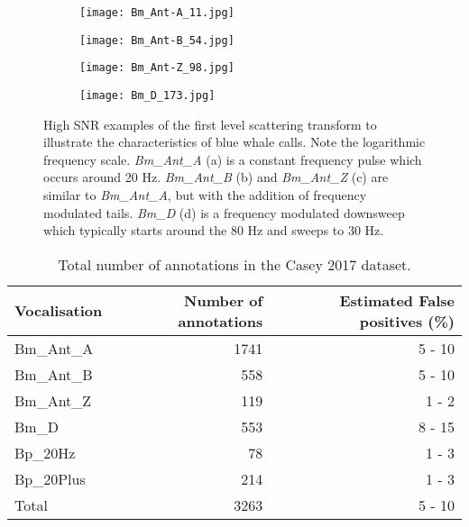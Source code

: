 {\begin{figure}
     \centering
     \begin{subfigure}[]{0.45\textwidth}
         \centering
         \texttt{[image: Bm\_Ant-A\_11.jpg]}
     \end{subfigure}
     \hfill
     \begin{subfigure}[]{0.45\textwidth}
         \centering
         \texttt{[image: Bm\_Ant-B\_54.jpg]}
     \end{subfigure}
     \hfill
     \begin{subfigure}[]{0.45\textwidth}
         \centering
         \texttt{[image: Bm\_Ant-Z\_98.jpg]}
     \end{subfigure}
     \hfill
     \begin{subfigure}[]{0.45\textwidth}
         \centering
         \texttt{[image: Bm\_D\_173.jpg]}
     \end{subfigure}
        \caption[High SNR examples of the first level scattering transform to illustrate the characteristics of blue whale calls.]{High SNR examples of the first level scattering transform to illustrate the characteristics of blue whale calls. Note the logarithmic frequency scale.  \textit{Bm\_Ant\_A} (a) is a constant frequency pulse which occurs around 20 Hz. \textit{Bm\_Ant\_B} (b) and \textit{Bm\_Ant\_Z} (c) are similar to \textit{Bm\_Ant\_A}, but with the addition of frequency modulated tails. \textit{Bm\_D} (d) is a frequency modulated downsweep which typically starts around the 80 Hz and sweeps to 30 Hz.}
        \label{fig:Bm_Ex}
\end{figure}

\begin{table}[h!]
\caption{Total number of annotations in the Casey 2017 dataset.}
\label{tab:numannotations}
\begin{tabular}{lrr} 
\textbf{Vocalisation}      & \textbf{Number of annotations} & \textbf{Estimated False positives (\%)} \\ \hline
Bm\_Ant\_A & 1741  & 5 - 10               \\
Bm\_Ant\_B & 558  & 5 - 10                 \\
Bm\_Ant\_Z & 119    & 1 - 2               \\
Bm\_D      & 553     & 8 - 15              \\
Bp\_20Hz & 78        & 1 - 3             \\
Bp\_20Plus & 214     & 1 - 3               \\ 
Total & 3263 & 5 - 10\\ 
\end{tabular}
\end{table}

}
